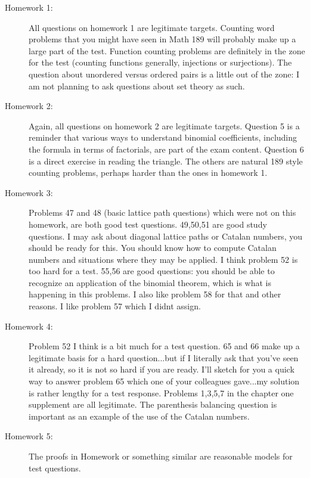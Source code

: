 \documentclass[12pt]{article}
\begin{document}
\begin{description}

\item[Homework 1:]  All questions on homework 1 are legitimate targets.  Counting word problems that you might have seen in Math 189 will probably make up a large part of the test.  Function counting problems are definitely in the zone for the test (counting functions generally, injections or surjections).  The question about unordered versus ordered pairs is a little out of the zone:  I am not planning to ask questions about set theory as such.

\item[Homework 2:]  Again, all questions on homework 2 are legitimate targets.   Question 5 is a reminder that various ways to understand binomial coefficients, including the formula in terms of factorials, are part of the exam content.  Question 6 is a direct exercise in reading the triangle.   The others are natural 189 style counting problems, perhaps harder than the ones in homework 1.

\item[Homework 3:]   Problems 47 and 48 (basic lattice path questions) which were not on this homework, are both good test questions.  49,50,51 are good study questions.  I may ask about diagonal lattice paths or Catalan numbers, you should be ready for this.  You should know how to compute Catalan numbers and situations where they may be applied.  I think problem 52 is too hard for a test.  55,56 are good questions:  you should be able to recognize an application of the binomial theorem, which is what is happening in this problems.  I also like problem 58 for that and other reasons.  I like problem 57 which I didnt assign.

\item[Homework 4:]  Problem 52 I think is a bit much for a test question.  65 and 66 make up a legitimate basis for a hard question...but if I literally ask that you've seen it already, so it is not so hard if you are ready.  I'll sketch for you a quick way to answer problem 65 which one of your colleagues gave...my solution is rather lengthy for a test response.  Problems 1,3,5,7 in the chapter one supplement are all legitimate.  The parenthesis balancing question is important as an example of the use of the Catalan numbers.

\item[Homework 5:]  The proofs in Homework or something similar are reasonable models for test questions.


\end{description}
\end{document}
